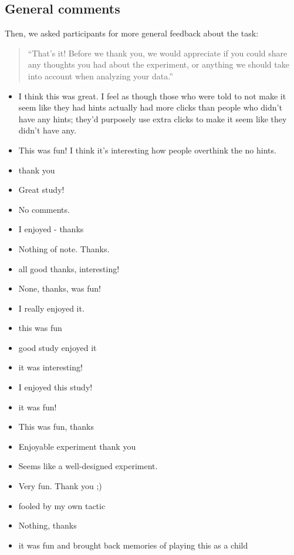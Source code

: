 \documentclass[
  english,
  man]{apa6}
\providecommand{\tightlist}{%
  \setlength{\itemsep}{0pt}\setlength{\parskip}{0pt}}
\begin{document}
\hypertarget{general-comments}{%
\subsection{General comments}\label{general-comments}}

Then, we asked participants for more general feedback about the task:

\begin{quote}
``That's it! Before we thank you, we would appreciate if you could share any thoughts you had about the experiment, or anything we should take into account when analyzing your data.''
\end{quote}

\begin{itemize}
\tightlist
\item
  I think this was great. I feel as though those who were told to not make it seem like they had hints actually had more clicks than people who didn't have any hints; they'd purposely use extra clicks to make it seem like they didn't have any.
\item
  This was fun! I think it's interesting how people overthink the no hints.
\item
  thank you
\item
  Great study!
\item
  No comments.
\item
  I enjoyed - thanks
\item
  Nothing of note. Thanks.
\item
  all good thanks, interesting!
\item
  None, thanks, was fun!
\item
  I really enjoyed it.
\item
  this was fun
\item
  good study enjoyed it
\item
  it was interesting!
\item
  I enjoyed this study!
\item
  it was fun!
\item
  This was fun, thanks
\item
  Enjoyable experiment thank you
\item
  Seems like a well-designed experiment.
\item
  Very fun. Thank you ;)
\item
  fooled by my own tactic
\item
  Nothing, thanks
\item
  it was fun and brought back memories of playing this as a child

\end{itemize}
\end{document}
